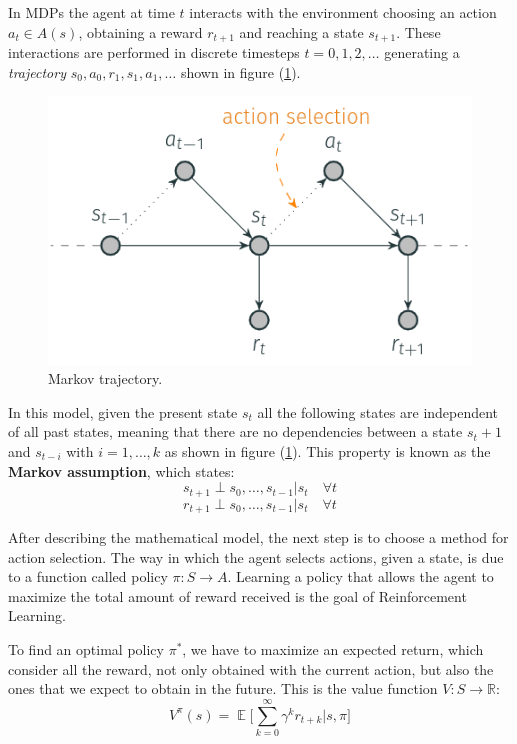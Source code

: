 \documentclass{article}
\DeclareMathOperator{\EX}{\mathbb{E}}%
\newcommand{\R}{\mathbb{R}} %
\begin{document}
In MDPs the agent at time $t$ interacts with the environment choosing an action $a_t\in A(s)$, obtaining a reward $r_{t+1}$ and reaching a state $s_{t+1}$. These interactions are performed in discrete timesteps $t = 0,1,2,\dots$ generating a \textit{trajectory} $s_0, a_0, r_1, s_1, a_1, \dots$ shown in figure (\ref{fig:markov_assumption}).
\begin{figure}[H]
	\centering
	\includegraphics[width=.7\textwidth]{images/markov_assumption.png}
	\caption{Markov trajectory.}
	\label{fig:markov_assumption}
\end{figure}

In this model, given the present state $s_t$ all the following states are independent of all past states, meaning that there are no dependencies between a state $s_t+1$ and $s_{t-i}$ with $i=1,\dots,k$ as shown in figure (\ref{fig:markov_assumption}). This property is known as the \textbf{Markov assumption}, which states:
\begin{equation}
    s_{t+1}  \perp  s_0, \dots , s_{t-1} | s_t \quad \forall t
\end{equation}
\begin{equation}
    r_{t+1} \perp  s_0, \dots , s_{t-1}| s_t \quad \forall t
\end{equation}

After describing the mathematical model, the next step is to choose a method for action selection. The way in which the agent selects actions, given a state, is due to a function called policy $\pi : S \rightarrow A$. Learning a policy that allows the agent to maximize the total amount of reward received is the goal of Reinforcement Learning. 

To find an optimal policy $\pi ^*$, we have to maximize an expected return, which consider all the reward, not only obtained with the current action, but also the ones that we expect to obtain in the future. This is the value function $V:S \rightarrow \R$:
\begin{equation}
    V^\pi(s) = \EX \bigg[\sum_{k=0}^{\infty} \gamma^k r_{t+k} | s,\pi\bigg]
\end{equation}
\end{document}
